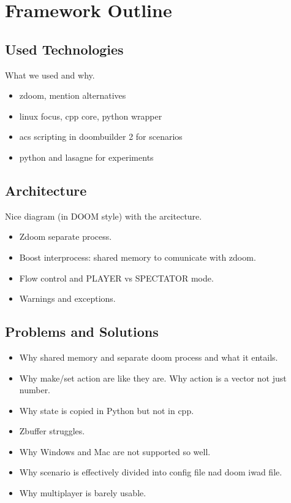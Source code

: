 
\chapter{Framework Outline}

\section{Used Technologies}
What we used and why.
\begin{itemize}
\item zdoom, mention alternatives
\item linux focus, cpp core, python wrapper
\item acs scripting in doombuilder 2 for scenarios
\item python and lasagne for experiments
\end{itemize}

\section{Architecture}
Nice diagram (in DOOM style) with the arcitecture.
\begin{itemize}
\item Zdoom separate process.
\item Boost interprocess: shared memory to comunicate with zdoom.
\item Flow control and PLAYER vs SPECTATOR mode.
\item Warnings and exceptions.
\end{itemize}

\section{Problems and Solutions}
\begin{itemize}
\item Why shared memory and separate doom process and what it entails.
\item Why make/set action are like they are. Why action is a vector not just number.
\item Why state is copied in Python but not in cpp.
\item Zbuffer struggles.
\item Why Windows and Mac are not supported so well.
\item Why scenario is effectively divided into config file nad doom iwad file.
\item Why multiplayer is barely usable.
\end{itemize}

